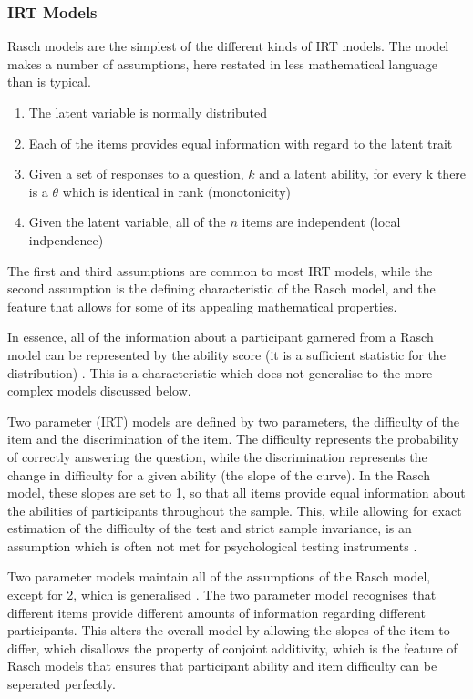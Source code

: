 \subsubsection{IRT Models}
\label{sec:irt-models}
Rasch models are the simplest of the different kinds of IRT models. The model makes a number of assumptions, here restated in less mathematical language than is typical\cite{fischer1995rasch}.

\begin{enumerate}
\item The latent variable is normally distributed
\item Each of the items provides equal information with regard to the latent trait
\item Given a set of responses to a question, $k$ and a latent ability, for every k there is a $\theta$ which is identical in rank (monotonicity)
\item Given the latent variable, all of the $n$ items are independent (local indpendence)
\end{enumerate}

The first and third assumptions are common to most IRT models, while the second assumption is the defining characteristic of the Rasch model, and the feature that allows for some of its appealing mathematical properties.

In essence, all of the information about a participant garnered from a Rasch model can be represented by the ability score (it is a sufficient statistic for the distribution) \cite{fischer1995rasch}. This is a characteristic which does not generalise to the more complex models discussed below.

Two parameter (IRT) models are defined by two parameters, the difficulty of the item and the discrimination of the item. The difficulty represents the probability of correctly answering the question, while the discrimination represents the change in difficulty for a given ability (the slope of the curve). In the Rasch model, these slopes are set to 1, so that all items provide equal information about the abilities of participants throughout the sample. This, while allowing for exact estimation of the difficulty of the test and strict sample invariance, is an assumption which is often not met for psychological testing instruments \cite{embretson2000item}.

Two parameter models maintain all of the assumptions of the Rasch model, except for 2, which is generalised \cite{van1997handbook}. The two parameter model recognises that different items provide different amounts of information regarding different participants. This alters the overall model by allowing the slopes of the item to differ, which disallows the property of conjoint additivity, which is the feature of Rasch models that ensures that participant ability and item difficulty can be seperated perfectly.

